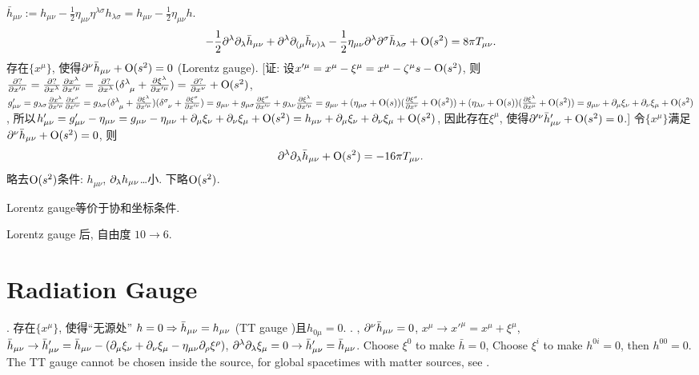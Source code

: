 $\bar{h}_{\mu\nu}:=h_{\mu\nu}-\frac{1}{2}\eta_{\mu\nu}\eta^{\lambda\sigma}h_{\lambda\sigma}=h_{\mu\nu}-\frac{1}{2}\eta_{\mu\nu}h$.
\begin{equation}
    -\frac{1}{2} \partial^{\lambda} \partial_{\lambda} \bar{h}_{\mu \nu}+\partial^{\lambda} \partial_{(\mu} \bar{h}_{\nu) \lambda}-\frac{1}{2} \eta_{\mu \nu} \partial^{\lambda} \partial^{\sigma} \bar{h}_{\lambda \sigma}+\text{O}(s^2)=8 \pi T_{\mu \nu}.
\end{equation}
存在$\{x^{\mu}\}$, 使得$\partial^{\nu}\bar{h}_{\mu\nu}+\text{O}(s^2)=0$ (Lorentz gauge). [证: 设$x'^\mu=x^\mu-\xi^\mu=x^\mu-\zeta^\mu s-\text{O}(s^2)$, 则$\frac{\p ?}{\p x'^\mu}=\frac{\p ?}{\p x^\lambda}\frac{\p x^\lambda}{\p x'^\mu}=\frac{\p ?}{\p x^\lambda}(\delta^{\lambda}_{\ph{\lambda}\mu}+\frac{\p \xi^\lambda}{\p x'^\mu})=\frac{\p ?}{\p x^\nu}+\t{O}(s^2)$, $g'_{\mu\nu}=g_{\lambda\sigma}\frac{\p x^\lambda}{\p x'^\mu}\frac{\p x^\sigma}{\p x'^\nu}=g_{\lambda\sigma}(\delta^{\lambda}_{\ph{\lambda}\mu}+\frac{\p \xi^\lambda}{\p x'^\mu})(\delta^{\sigma}_{\ph{\sigma}\nu}+\frac{\p \xi^\sigma}{\p x'^\nu})=g_{\mu\nu}+g_{\mu\sigma}\frac{\p \xi^\sigma}{\p x'^\nu}+g_{\lambda\nu}\frac{\p \xi^\lambda}{\p x'^\mu}=g_{\mu\nu}+(\eta_{\mu\sigma}+\t{O}(s))(\frac{\p \xi^\sigma}{\p x^\nu}+\t{O}(s^2))+(\eta_{\lambda\nu}+\t{O}(s))(\frac{\p \xi^\lambda}{\p x^\mu}+\t{O}(s^2))=g_{\mu\nu}+\p_\mu\xi_\nu+\p_\nu\xi_\mu+\t{O}(s^2)$, 所以$h'_{\mu\nu}=g'_{\mu\nu}-\eta_{\mu\nu}=g_{\mu\nu}-\eta_{\mu\nu}+\partial_\mu\xi_\nu+\partial_\nu\xi_\mu+\text{O}(s^2)=h_{\mu\nu}+\partial_\mu\xi_\nu+\partial_\nu\xi_\mu+\text{O}(s^2)$, 因此存在$\xi^\mu$, 使得$\partial'^{\nu}\bar{h}'_{\mu\nu}+\text{O}(s^2)=0$.] 令$\{x^{\mu}\}$满足$\partial^{\nu}\bar{h}_{\mu\nu}+\text{O}(s^2)=0$, 则
\begin{equation}
    \partial^{\lambda}\partial_{\lambda}\bar{h}_{\mu\nu}+\text{O}(s^2)=-16\pi T_{\mu \nu}.\label{lin_gravity}
\end{equation}
略去$\text{O}(s^2)$条件: $h_{\mu\nu}$, $\partial_\lambda h_{\mu\nu}$\dots{}小. 下略$\text{O}(s^2)$.

Lorentz gauge等价于协和坐标条件.

Lorentz gauge 后, 自由度 $10\to6$.

\section{Radiation Gauge}

\cite{Wald1984}. 存在$\{x^{\mu}\}$, 使得``无源处'' $h=0\Rightarrow\bar{h}_{\mu\nu}=h_{\mu\nu}$ (TT gauge \cite{王2020,Hughes2009})且$h_{0\mu}=0$. \cite{Maggiore2014}. \cite{Maggiore2014}, $\partial^\nu \bar{h}_{\mu\nu}=0$, $x^\mu\to x'^\mu = x^\mu+\xi^\mu$, $\bar{h}_{\mu\nu}\to\bar{h}'_{\mu\nu}=\bar{h}_{\mu\nu}-(\partial_\mu\xi_\nu+\partial_\nu\xi_\mu-\eta_{\mu\nu}\partial_\rho\xi^\rho)$, $\partial^{\lambda}\partial_{\lambda}\xi_{\mu}=0\to\bar{h}'_{\mu\nu}=\bar{h}_{\mu\nu}$. Choose $\xi^0$ to make $\bar{h}=0$, Choose $\xi^i$ to make $h^{0i}=0$, then $h^{00}=0$. The TT gauge cannot be chosen inside the source, for global spacetimes with matter sources, see \cite{Flanagan2005}.

